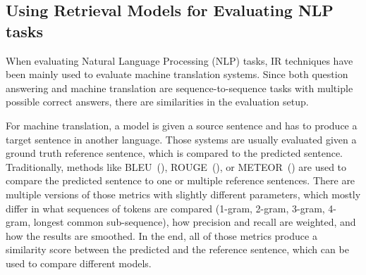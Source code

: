 \subsection{Using Retrieval Models for Evaluating NLP tasks}\label{sec:eval-mts-ir}
When evaluating Natural Language Processing (NLP) tasks, IR techniques have been mainly used to evaluate machine translation systems.
Since both question answering and machine translation are sequence-to-sequence tasks with multiple possible correct answers, there are similarities in the evaluation setup.

For machine translation, a model is given a source sentence and has to produce a target sentence in another language.
Those systems are usually evaluated given a ground truth reference sentence, which is compared to the predicted sentence.
Traditionally, methods like BLEU~(\cite{papineni:2002:Bleu}), ROUGE~(\cite{lin:2004:Rouge}), or METEOR~(\cite{banerjee:2005:METEOR}) are used to compare the predicted sentence to one or multiple reference sentences.
There are multiple versions of those metrics with slightly different parameters, which mostly differ in what sequences of tokens are compared (1-gram, 2-gram, 3-gram, 4-gram, longest common sub-sequence), how precision and recall are weighted, and how the results are smoothed.
In the end, all of those metrics produce a similarity score between the predicted and the reference sentence, which can be used to compare different models.

